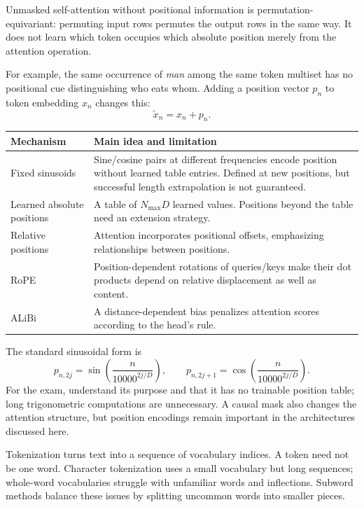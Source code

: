 \documentclass[11pt]{article}
\begin{document}
Unmasked self-attention without positional information is permutation-equivariant: permuting input rows permutes the output rows in the same way. It does not learn which token occupies which absolute position merely from the attention operation.

For example, the same occurrence of \emph{man} among the same token multiset has no positional cue distinguishing who eats whom. Adding a position vector $p_n$ to token embedding $x_n$ changes this:
\[
\widetilde{x}_n=x_n+p_n.
\]
\begin{longtable}{@{}P{.24\textwidth}P{.66\textwidth}@{}}
\toprule Mechanism & Main idea and limitation\\\midrule\endhead
Fixed sinusoids & Sine/cosine pairs at different frequencies encode position without learned table entries. Defined at new positions, but successful length extrapolation is not guaranteed.\\
Learned absolute positions & A table of $N_{\max}D$ learned values. Positions beyond the table need an extension strategy.\\
Relative positions & Attention incorporates positional offsets, emphasizing relationships between positions.\\
RoPE & Position-dependent rotations of queries/keys make their dot products depend on relative displacement as well as content.\\
ALiBi & A distance-dependent bias penalizes attention scores according to the head's rule.\\\bottomrule
\end{longtable}
The standard sinusoidal form is
\[
p_{n,2j}=\sin\!\left(\frac{n}{10000^{2j/D}}\right),\qquad
p_{n,2j+1}=\cos\!\left(\frac{n}{10000^{2j/D}}\right).
\]
For the exam, understand its purpose and that it has no trainable position table; long trigonometric computations are unnecessary. A causal mask also changes the attention structure, but position encodings remain important in the architectures discussed here.

Tokenization turns text into a sequence of vocabulary indices. A token need not be one word. Character tokenization uses a small vocabulary but long sequences; whole-word vocabularies struggle with unfamiliar words and inflections. Subword methods balance these issues by splitting uncommon words into smaller pieces.
\end{document}
